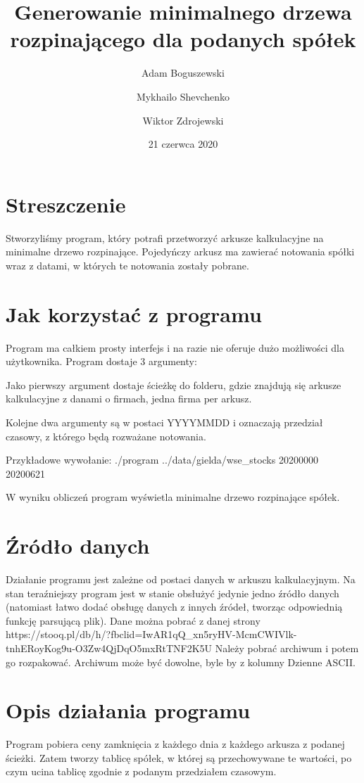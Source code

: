 \documentclass{article}
\title{Generowanie minimalnego drzewa rozpinającego dla podanych spółek}
\author{
    Adam Boguszewski \and
    Mykhailo Shevchenko \and
    Wiktor Zdrojewski
}
\date{21 czerwca 2020}
\begin{document}
\maketitle

\section{Streszczenie}
Stworzyliśmy program, który potrafi przetworzyć arkusze kalkulacyjne
na minimalne drzewo rozpinające. Pojedyńczy arkusz ma zawierać notowania
spółki wraz z datami, w których te notowania zostały pobrane.

\section{Jak korzystać z programu}
Program ma całkiem prosty interfejs i na razie nie oferuje dużo możliwości
dla użytkownika. Program dostaje 3 argumenty:

Jako pierwszy argument dostaje ścieżkę do folderu, gdzie
znajdują się arkusze kalkulacyjne z danami o firmach, jedna firma per arkusz.

Kolejne dwa argumenty są w postaci YYYYMMDD i oznaczają przedział czasowy,
z którego będą rozważane notowania.

Przykładowe wywołanie:\newline
./program ../data/gielda/wse\_stocks 20200000 20200621

W wyniku obliczeń program wyświetla minimalne drzewo rozpinające spółek.

\section{Źródło danych}
Działanie programu jest zależne od postaci danych w arkuszu kalkulacyjnym.
Na stan teraźniejszy program jest w stanie obsłużyć jedynie jedno źródło danych
(natomiast łatwo dodać obsługę danych z innych źródeł, tworząc odpowiednią funkcję parsującą plik).
Dane można pobrać z danej strony\newline
https://stooq.pl/db/h/?fbclid=IwAR1qQ\_xn5ryHV-McmCWIVlk-tnhERoyKog9u-O3Zw4QjDqO5mxRtTNF2K5U\newline
Należy pobrać archiwum i potem go rozpakować. Archiwum może być dowolne, byle by z kolumny Dzienne ASCII.

\section{Opis działania programu}
Program pobiera ceny zamknięcia z każdego dnia z każdego arkusza z podanej ścieżki.
Zatem tworzy tablicę spółek, w której są przechowywane te wartości, po czym
ucina tablicę zgodnie z podanym przedziałem czasowym.
\end{document}
